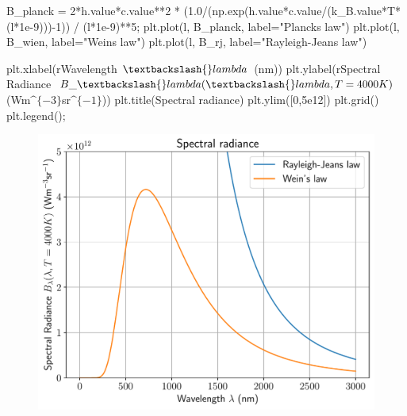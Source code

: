 \documentclass[
  letterpaper,
  DIV=11,
  numbers=noendperiod]{scrreprt}
\newenvironment{Shaded}{\begin{snugshade}}{\end{snugshade}}
\newcommand{\DecValTok}[1]{\textcolor[rgb]{0.68,0.00,0.00}{#1}}
\newcommand{\FloatTok}[1]{\textcolor[rgb]{0.68,0.00,0.00}{#1}}
\newcommand{\NormalTok}[1]{\textcolor[rgb]{0.00,0.23,0.31}{#1}}
\newcommand{\OperatorTok}[1]{\textcolor[rgb]{0.37,0.37,0.37}{#1}}
\newcommand{\StringTok}[1]{\textcolor[rgb]{0.13,0.47,0.30}{#1}}
\newcommand{\VerbatimStringTok}[1]{\textcolor[rgb]{0.13,0.47,0.30}{#1}}
\begin{document}
\begin{Shaded}
\begin{Highlighting}[]
\NormalTok{B\_planck }\OperatorTok{=} \DecValTok{2}\OperatorTok{*}\NormalTok{h.value}\OperatorTok{*}\NormalTok{c.value}\OperatorTok{**}\DecValTok{2} \OperatorTok{*}\NormalTok{ (}\FloatTok{1.0}\OperatorTok{/}\NormalTok{(np.exp(h.value}\OperatorTok{*}\NormalTok{c.value}\OperatorTok{/}\NormalTok{(k\_B.value}\OperatorTok{*}\NormalTok{T}\OperatorTok{*}\NormalTok{(l}\OperatorTok{*}\FloatTok{1e{-}9}\NormalTok{)))}\OperatorTok{{-}}\DecValTok{1}\NormalTok{)) }\OperatorTok{/}\NormalTok{ (l}\OperatorTok{*}\FloatTok{1e{-}9}\NormalTok{)}\OperatorTok{**}\DecValTok{5}\OperatorTok{;}
\NormalTok{plt.plot(l, B\_planck, label}\OperatorTok{=}\StringTok{"Planck\textquotesingle{}s law"}\NormalTok{)}
\NormalTok{plt.plot(l, B\_wien, label}\OperatorTok{=}\StringTok{"Wein\textquotesingle{}s law"}\NormalTok{)}
\NormalTok{plt.plot(l, B\_rj, label}\OperatorTok{=}\StringTok{"Rayleigh{-}Jeans law"}\NormalTok{)}

\NormalTok{plt.xlabel(}\VerbatimStringTok{r\textquotesingle{}Wavelength $\textbackslash{}lambda$ (nm)\textquotesingle{}}\NormalTok{)}
\NormalTok{plt.ylabel(}\VerbatimStringTok{r\textquotesingle{}Spectral Radiance $B\_\textbackslash{}lambda(\textbackslash{}lambda, T=4000K)$ (Wm$\^{}\{{-}3\}$sr$\^{}\{{-}1\}$)\textquotesingle{}}\NormalTok{)}
\NormalTok{plt.title(}\StringTok{\textquotesingle{}Spectral radiance\textquotesingle{}}\NormalTok{)}
\NormalTok{plt.ylim([}\DecValTok{0}\NormalTok{,}\FloatTok{5e12}\NormalTok{])}
\NormalTok{plt.grid()}
\NormalTok{plt.legend()}\OperatorTok{;}
\end{Highlighting}
\end{Shaded}

\begin{figure}[H]

{\centering \includegraphics{SP1.1_-_Stellar_Properties_files/figure-pdf/cell-20-output-1.pdf}

}

\end{figure}
\end{document}

